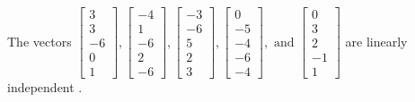 \begin{exercise}
\begin{exerciseStatement}
  \end{exerciseStatement}
  \begin{exerciseAnswer}
   The vectors \(\left[\begin{array}{r}
3 \\
3 \\
-6 \\
0 \\
1
\end{array}\right] , \left[\begin{array}{r}
-4 \\
1 \\
-6 \\
2 \\
-6
\end{array}\right] , \left[\begin{array}{r}
-3 \\
-6 \\
5 \\
2 \\
3
\end{array}\right] , \left[\begin{array}{r}
0 \\
-5 \\
-4 \\
-6 \\
-4
\end{array}\right] , \text{ and } \left[\begin{array}{r}
0 \\
3 \\
2 \\
-1 \\
1
\end{array}\right]\) are 
  	 linearly independent  .
  


  \end{exerciseAnswer}
\end{exercise}